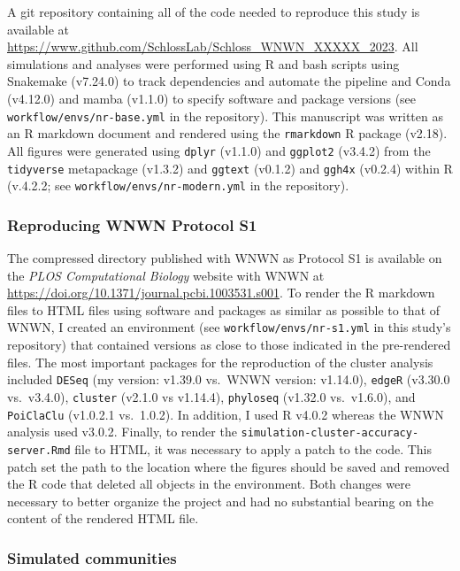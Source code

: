 \documentclass[
]{article}
\begin{document}
A git repository containing all of the code needed to reproduce this
study is available at
\url{https://www.github.com/SchlossLab/Schloss_WNWN_XXXXX_2023}. All
simulations and analyses were performed using R and bash scripts using
Snakemake (v7.24.0) to track dependencies and automate the pipeline and
Conda (v4.12.0) and mamba (v1.1.0) to specify software and package
versions (see \texttt{workflow/envs/nr-base.yml} in the repository).
This manuscript was written as an R markdown document and rendered using
the \texttt{rmarkdown} R package (v2.18). All figures were generated
using \texttt{dplyr} (v1.1.0) and \texttt{ggplot2} (v3.4.2) from the
\texttt{tidyverse} metapackage (v1.3.2) and \texttt{ggtext} (v0.1.2) and
\texttt{ggh4x} (v0.2.4) within R (v.4.2.2; see
\texttt{workflow/envs/nr-modern.yml} in the repository).

\hypertarget{reproducing-wnwn-protocol-s1}{%
\subsubsection{Reproducing WNWN Protocol
S1}\label{reproducing-wnwn-protocol-s1}}

The compressed directory published with WNWN as Protocol S1 is available
on the \emph{PLOS Computational Biology} website with WNWN at
\url{https://doi.org/10.1371/journal.pcbi.1003531.s001}. To render the R
markdown files to HTML files using software and packages as similar as
possible to that of WNWN, I created an environment (see
\texttt{workflow/envs/nr-s1.yml} in this study's repository) that
contained versions as close to those indicated in the pre-rendered
files. The most important packages for the reproduction of the cluster
analysis included \texttt{DESeq} (my version: v1.39.0 vs.~WNWN version:
v1.14.0), \texttt{edgeR} (v3.30.0 vs.~v3.4.0), \texttt{cluster} (v2.1.0
vs v1.14.4), \texttt{phyloseq} (v1.32.0 vs.~v1.6.0), and
\texttt{PoiClaClu} (v1.0.2.1 vs.~1.0.2). In addition, I used R v4.0.2
whereas the WNWN analysis used v3.0.2. Finally, to render the
\texttt{simulation-cluster-accuracy-server.Rmd} file to HTML, it was
necessary to apply a patch to the code. This patch set the path to the
location where the figures should be saved and removed the R code that
deleted all objects in the environment. Both changes were necessary to
better organize the project and had no substantial bearing on the
content of the rendered HTML file.

\hypertarget{simulated-communities}{%
\subsubsection{Simulated communities}\label{simulated-communities}}
\end{document}
